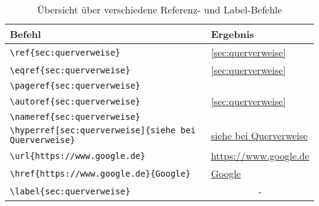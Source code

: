 \begin{table}[H]
    \centering
    \begin{tabular}{ll}
        \toprule
        \textbf{Befehl}                                                              & \textbf{Ergebnis}                                   \\
        \midrule
        \texttt{\textbackslash ref\{sec:querverweise\}}                              & \ref{sec:querverweise}                              \\
        \texttt{\textbackslash eqref\{sec:querverweise\}}                            & \eqref{sec:querverweise}                            \\
        \texttt{\textbackslash pageref\{sec:querverweise\}}                          & \pageref{sec:querverweise}                          \\
        \texttt{\textbackslash autoref\{sec:querverweise\}}                          & \autoref{sec:querverweise}                          \\
        \texttt{\textbackslash nameref\{sec:querverweise\}}                          & \nameref{sec:querverweise}                          \\
        \texttt{\textbackslash hyperref[sec:querverweise]\{siehe bei Querverweise\}} & \hyperref[sec:querverweise]{siehe bei Querverweise} \\
        \texttt{\textbackslash url\{https://www.google.de\}}                         & \url{https://www.google.de}                         \\
        \texttt{\textbackslash href\{https://www.google.de\}\{Google\}}              & \href{https://www.google.de}{Google}                \\
        \midrule
        \texttt{\textbackslash label\{sec:querverweise\}}                            & \multicolumn{1}{c}{-}                               \\
        \bottomrule
    \end{tabular}
    \caption{Übersicht über verschiedene Referenz- und Label-Befehle}
    \label{tab:querverweise}
\end{table}